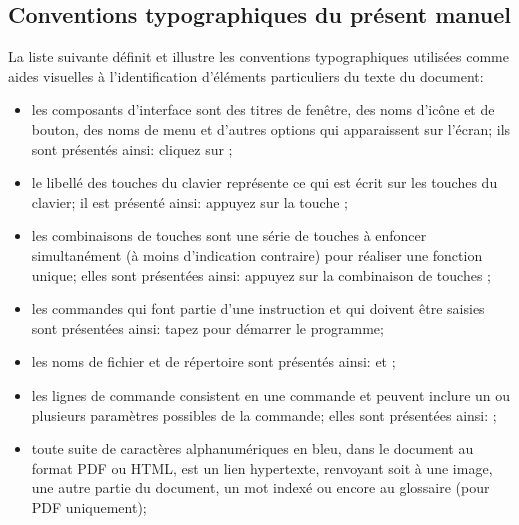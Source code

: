 \subsection{Conventions typographiques du présent manuel\label{introduction-manual-conventions}}

La liste suivante définit et illustre les conventions typographiques utilisées comme aides visuelles à l'identification d'éléments particuliers du texte du document:

\begin{itemize}
	\item les composants d'interface sont des titres de fenêtre, des noms d'icône et de bouton, des noms de menu et d'autres options qui apparaissent sur l'écran; ils sont présentés ainsi:
		\newline
		\hspace*{1.5cm}cliquez sur ;
	\item le libellé des touches du clavier représente ce qui est écrit sur les touches du clavier; il est présenté ainsi:
		\newline
		\hspace*{1.5cm}appuyez sur la touche ;	
	\item les combinaisons de touches sont une série de touches à enfoncer 	simultanément (à moins d'indication contraire) pour réaliser une fonction unique; elles sont présentées ainsi:
		\newline
		\hspace*{1.5cm}appuyez sur la combinaison de touches ;
	\item les commandes qui font partie d'une instruction et qui doivent être saisies sont présentées ainsi:
		\newline
		\hspace*{1.5cm}tapez  pour démarrer le programme;
	\item les noms de fichier et de répertoire sont présentés ainsi:
		\newline
		\hspace*{1.5cm} et ;	
	\item les lignes de commande consistent en une commande et peuvent inclure un ou plusieurs paramètres possibles de la commande; elles sont présentées ainsi:
		\newline
		\hspace*{1.5cm}	;
	\item toute suite de caractères alphanumériques en bleu, dans le document au format \gls{PDF} ou \gls{HTML}, est un lien hypertexte, renvoyant soit à une image, une autre partie du document, un mot indexé ou encore au glossaire (pour \gls{PDF} uniquement);

\end{itemize}
